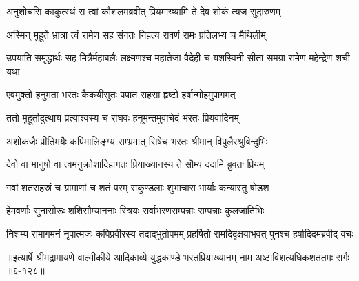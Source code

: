 \twolineshloka
{अनुशोचसि काकुत्स्थं स त्वां कौशलमब्रवीत्}
{प्रियमाख्यामि ते देव शोकं त्यज सुदारुणम्} %

\twolineshloka
{अस्मिन् मुहूर्ते भ्रात्रा त्वं रामेण सह संगतः}
{निहत्य रावणं रामः प्रतिलभ्य च मैथिलीम्} %

\threelineshloka
{उपयाति समृद्धार्थः सह मित्रैर्महाबलैः}
{लक्ष्मणश्च महातेजा वैदेही च यशस्विनी}
{सीता समग्रा रामेण महेन्द्रेण शची यथा} %

\twolineshloka
{एवमुक्तो हनुमता भरतः कैकयीसुतः}
{पपात सहसा हृष्टो हर्षान्मोहमुपागमत्} %

\twolineshloka
{ततो मुहूर्तादुत्थाय प्रत्याश्वस्य च राघवः}
{हनूमन्तमुवाचेदं भरतः प्रियवादिनम्} %

\twolineshloka
{अशोकजैः प्रीतिमयैः कपिमालिङ्ग्य सम्भ्रमात्}
{सिषेच भरतः श्रीमान् विपुलैरश्रुबिन्दुभिः} %

\twolineshloka
{देवो वा मानुषो वा त्वमनुक्रोशादिहागतः}
{प्रियाख्यानस्य ते सौम्य ददामि ब्रुवतः प्रियम्} %

\twolineshloka
{गवां शतसहस्रं च ग्रामाणां च शतं परम्}
{सकुण्डलाः शुभाचारा भार्याः कन्यास्तु षोडश} %

\twolineshloka
{हेमवर्णाः सुनासोरूः शशिसौम्याननाः स्त्रियः}
{सर्वाभरणसम्पन्नाः सम्पन्नाः कुलजातिभिः} %

\twolineshloka
{निशम्य रामागमनं नृपात्मजः कपिप्रवीरस्य तदाद्भुतोपमम्}
{प्रहर्षितो रामदिदृक्षयाभवत् पुनश्च हर्षादिदमब्रवीद् वचः} %


॥इत्यार्षे श्रीमद्रामायणे वाल्मीकीये आदिकाव्ये युद्धकाण्डे भरतप्रियाख्यानम् नाम अष्टाविंशत्यधिकशततमः सर्गः ॥६-१२८॥
